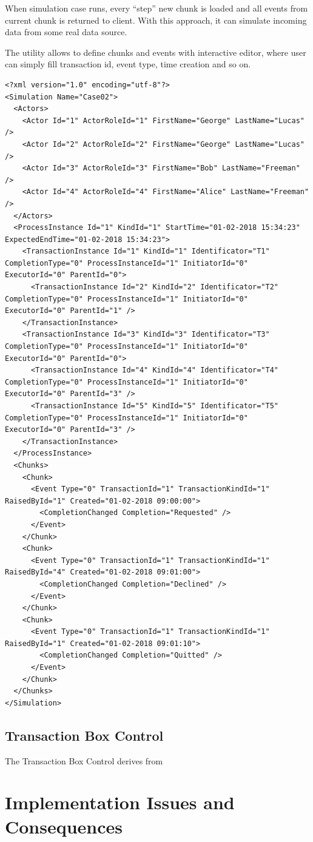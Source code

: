 When simulation case runs, every ``step'' new chunk is loaded and all events from current chunk is returned to client. With this approach, it can simulate incoming data from some real data source.

The utility allows to define chunks and events with interactive editor, where user can simply fill transaction id, event type, time creation and so on. 

\begin{verbatim}
<?xml version="1.0" encoding="utf-8"?>
<Simulation Name="Case02">
  <Actors>
    <Actor Id="1" ActorRoleId="1" FirstName="George" LastName="Lucas" />
    <Actor Id="2" ActorRoleId="2" FirstName="George" LastName="Lucas" />
    <Actor Id="3" ActorRoleId="3" FirstName="Bob" LastName="Freeman" />
    <Actor Id="4" ActorRoleId="4" FirstName="Alice" LastName="Freeman" />
  </Actors>
  <ProcessInstance Id="1" KindId="1" StartTime="01-02-2018 15:34:23" ExpectedEndTime="01-02-2018 15:34:23">
    <TransactionInstance Id="1" KindId="1" Identificator="T1" CompletionType="0" ProcessInstanceId="1" InitiatorId="0" ExecutorId="0" ParentId="0">
      <TransactionInstance Id="2" KindId="2" Identificator="T2" CompletionType="0" ProcessInstanceId="1" InitiatorId="0" ExecutorId="0" ParentId="1" />
    </TransactionInstance>
    <TransactionInstance Id="3" KindId="3" Identificator="T3" CompletionType="0" ProcessInstanceId="1" InitiatorId="0" ExecutorId="0" ParentId="0">
      <TransactionInstance Id="4" KindId="4" Identificator="T4" CompletionType="0" ProcessInstanceId="1" InitiatorId="0" ExecutorId="0" ParentId="3" />
      <TransactionInstance Id="5" KindId="5" Identificator="T5" CompletionType="0" ProcessInstanceId="1" InitiatorId="0" ExecutorId="0" ParentId="3" />
    </TransactionInstance>
  </ProcessInstance>
  <Chunks>
    <Chunk>
      <Event Type="0" TransactionId="1" TransactionKindId="1" RaisedById="1" Created="01-02-2018 09:00:00">
        <CompletionChanged Completion="Requested" />
      </Event>
    </Chunk>
    <Chunk>
      <Event Type="0" TransactionId="1" TransactionKindId="1"  RaisedById="4" Created="01-02-2018 09:01:00">
        <CompletionChanged Completion="Declined" />
      </Event>
    </Chunk>
    <Chunk>
      <Event Type="0" TransactionId="1" TransactionKindId="1"  RaisedById="1" Created="01-02-2018 09:01:10">
        <CompletionChanged Completion="Quitted" />
      </Event>
    </Chunk>
  </Chunks>
</Simulation>
\end{verbatim}
\subsection{Transaction Box Control}
The Transaction Box Control derives from 
\section{Implementation Issues and Consequences}

